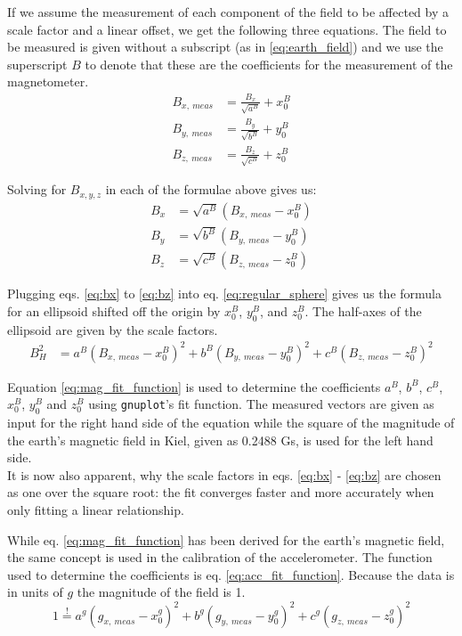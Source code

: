 If we assume the measurement of each component of the field to be affected by a scale factor and a linear offset, we get the following three equations. The field to be measured is given without a subscript (as in \eqref{eq:earth_field}) and we use the superscript $B$ to denote that these are the coefficients for the measurement of the magnetometer.
\begin{align}
    B_{x,\ meas} &= \frac{B_x}{\sqrt{a^B}}+x_0^B \\
    B_{y,\ meas} &= \frac{B_y}{\sqrt{b^B}}+y_0^B \\
    B_{z,\ meas} &= \frac{B_z}{\sqrt{c^B}}+z_0^B
\end{align}

Solving for $B_{x,y,z}$ in each of the formulae above gives us:
\begin{align}
    B_x&=\sqrt{a^B}(B_{x,\ meas}-x_0^B) \label{eq:bx} \\
    B_y&=\sqrt{b^B}(B_{y,\ meas}-y_0^B) \label{eq:by} \\
    B_z&=\sqrt{c^B}(B_{z,\ meas}-z_0^B) \label{eq:bz}
\end{align}

Plugging eqs. \eqref{eq:bx} to \eqref{eq:bz} into eq. \eqref{eq:regular_sphere} gives us the formula for an ellipsoid shifted off the origin by $x_0^B$, $y_0^B$, and $z_0^B$. The half-axes of the ellipsoid are given by the scale factors.
\begin{align}
    B_{H}^2&=a^B(B_{x,\ meas}-x_0^B)^2 + b^B(B_{y,\ meas}-y_0^B)^2 + c^B(B_{z,\ meas}-z_0^B)^2 
    \label{eq:mag_fit_function}
\end{align}

 Equation \eqref{eq:mag_fit_function} is used to determine the coefficients $a^B$, $b^B$, $c^B$, $x_0^B$, $y_0^B$ and $z_0^B$ using \verb|gnuplot|'s fit function. The measured vectors are given as input for the right hand side of the equation while the square of the magnitude of the earth's magnetic field in Kiel, given as 0.2488 Gs, is used for the left hand side.\\
It is now also apparent, why the scale factors in eqs. \eqref{eq:bx} - \eqref{eq:bz} are chosen as one over the square root: the fit converges faster and more accurately when only fitting a linear relationship.

While eq. \eqref{eq:mag_fit_function} has been derived for the earth's magnetic field, the same concept is used in the calibration of the accelerometer. The function used to determine the coefficients is eq. \eqref{eq:acc_fit_function}. Because the data is in units of $g$ the magnitude of the field is 1.
\begin{equation}
    1\overset{!}{=}a^g(g_{x,\ meas}-x_0^g)^2 + b^g(g_{y,\ meas}-y_0^g)^2 + c^g(g_{z,\ meas}-z_0^g)^2
    \label{eq:acc_fit_function}
\end{equation}

